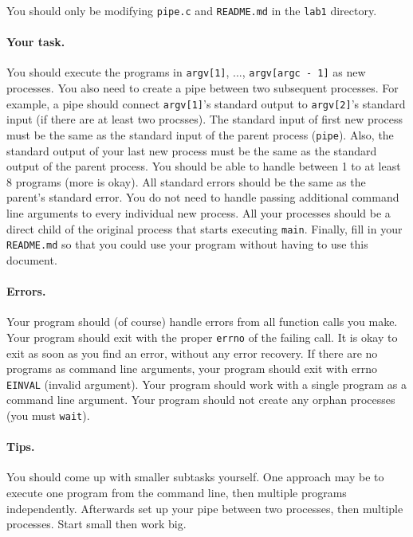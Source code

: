 You should only be modifying \texttt{pipe.c} and \texttt{README.md} in the
\texttt{lab1} directory.

\paragraph{Your task.}

You should execute the programs in \texttt{argv[1]}, ...,
\texttt{argv[argc - 1]} as new processes.
You also need to create a pipe between two subsequent processes.
For example, a pipe should connect \texttt{argv[1]}'s standard output to
\texttt{argv[2]}'s standard input (if there are at least two procsses).
The standard input of first new process must be the same as the standard input
of the parent process (\texttt{pipe}).
Also, the standard output of your last new process must be the same as the
standard output of the parent process.
You should be able to handle between 1 to at least 8 programs (more is okay).
All standard errors should be the same as the parent's standard error.
You do not need to handle passing additional command line arguments to every
individual new process.
All your processes should be a direct child of the original process that starts
executing \texttt{main}.
Finally, fill in your \texttt{README.md} so that you could use your program
without having to use this document.

\paragraph{Errors.}

Your program should (of course) handle errors from all function calls you make.
Your program should exit with the proper \texttt{errno} of the failing call.
It is okay to exit as soon as you find an error, without any error recovery.
If there are no programs as command line arguments, your program should exit
with errno \texttt{EINVAL} (invalid argument).
Your program should work with a single program as a command line argument.
Your program should not create any orphan processes (you must \texttt{wait}).

\paragraph{Tips.}

You should come up with smaller subtasks yourself.
One approach may be to execute one program from the command line, then multiple
programs independently. Afterwards set up your pipe between two processes, then
multiple processes.
Start small then work big.

